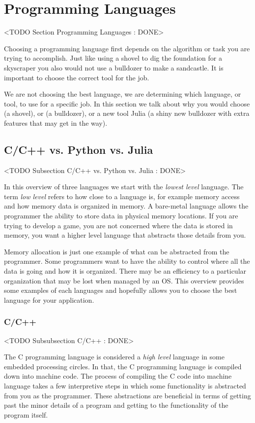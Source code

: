 \section{Programming Languages}
	<TODO Section Programming Languages : DONE>

Choosing a programming language first depends on the algorithm or task you are trying to accomplish. Just like using a shovel to dig the foundation for a skyscraper you also would not use a bulldozer to make a sandcastle. It is important to choose the correct tool for the job. 	
	
We are not choosing the best language, we are determining which language, or tool, to use for a specific job. In this section we talk about why you would choose  (a shovel), or  (a bulldozer), or a new tool Julia (a shiny new bulldozer with extra features that may get in the way). 	
	
	
\subsection{C/C++ vs. Python vs. Julia}
	<TODO Subsection C/C++ vs. Python vs. Julia : DONE>

In this overview of three languages we start with the \emph{lowest level} language. The term \emph{low level} refers to how close to \emph{} a language is, for example memory access and how memory data is organized in memory. A bare-metal language allows the programmer the ability to store data in physical memory locations. If you are trying to develop a game, you are not concerned where the data is stored in memory, you want a higher level language that abstracts those details from you. 

Memory allocation is just one example of what can be abstracted from the programmer. Some programmers want to have the ability to control where all the data is going and how it is organized. There may be an efficiency to a particular organization that may be lost when managed by an \ac{OS}. This overview provides some examples of each languages and hopefully allows you to choose the best language for your application.

\subsubsection{C/C++}
	<TODO Subsubsection  C/C++ : DONE>

The C programming language is considered a \emph{high level} language in some embedded processing circles. In that, the C programming language is compiled down into machine code. The process of compiling the C code into machine language takes a few interpretive steps in which some functionality is abstracted from you as the programmer. These abstractions are beneficial in terms of getting past the minor details of a program and getting to the functionality of the program itself. 

